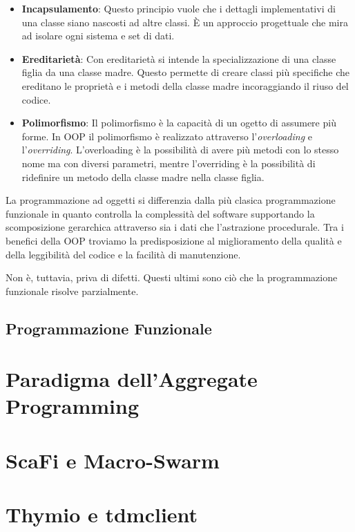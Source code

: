 \documentclass[12pt,a4paper,openright,twoside]{book}
\begin{document}
\begin{itemize}
    \item \textbf{Incapsulamento}: Questo principio vuole che i dettagli implementativi di una classe siano nascosti ad altre classi. È un approccio progettuale che mira ad isolare ogni sistema e set di dati. 
    \item \textbf{Ereditarietà}: Con ereditarietà si intende la specializzazione di una classe figlia da una classe madre. Questo permette di creare classi più specifiche che ereditano le proprietà e i metodi della classe madre incoraggiando il riuso del codice.
    \item \textbf{Polimorfismo}: Il polimorfismo è la capacità di un ogetto di assumere più forme. In OOP il polimorfismo è realizzato attraverso l'\textit{overloading} e l'\textit{overriding}. L'overloading è la possibilità di avere più metodi con lo stesso nome ma con diversi parametri, mentre l'overriding è la possibilità di ridefinire un metodo della classe madre nella classe figlia.
\end{itemize}

La programmazione ad oggetti si differenzia dalla più clasica programmazione funzionale in quanto controlla la complessità del software supportando la scomposizione gerarchica attraverso sia i dati che l'astrazione procedurale.
Tra i benefici della OOP troviamo la predisposizione al miglioramento della qualità e della leggibilità del codice e la facilità di manutenzione.

Non è, tuttavia, priva di difetti. Questi ultimi sono ciò che la programmazione funzionale risolve parzialmente.

\subsection{Programmazione Funzionale}

\section{Paradigma dell'Aggregate Programming}

\section{ScaFi e Macro-Swarm}

\section{Thymio e tdmclient}
\end{document}

